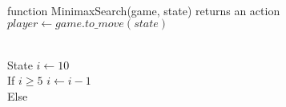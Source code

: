 \documentclass[preview]{standalone}
\begin{document}
\begin{center}
\begin{algorithmic}
            \\function MinimaxSearch(game, state) returns an action
            \\$player \gets game.to\_move(state)$
            
            \\State $i \gets 10$ 
            \\If {$i\geq 5$}
                \State $i \gets i-1$
            \\Else
            \end{algorithmic}
\end{center}
\end{document}
